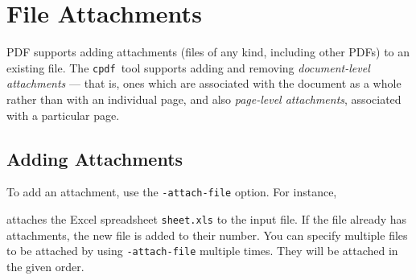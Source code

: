 \documentclass{book}
\newcommand{\cpdf}{\texttt{cpdf}}
\begin{document}
\noindent{}


\pagestyle{empty}\thispagestyle{fancy}



\chapter{File Attachments}\pagestyle{fancy}

\noindent{}


  PDF supports adding attachments (files of any kind, including other PDFs) to
an existing file. The \cpdf\ tool supports adding and removing \textit{document-level
attachments} --- that is, ones which are associated with the document as a
whole rather than with an individual page, and also \textit{page-level attachments}, associated with a particular page.
  \section{Adding Attachments}
  To add an attachment, use the \texttt{-attach-file} option. For instance,

\noindent{}

  \noindent attaches the Excel spreadsheet \texttt{sheet.xls} to the input file. If the file already has attachments, the new file is added to their number. You can specify multiple files to be attached by using \verb!-attach-file! multiple times. They will be attached in the given order.
  
\end{document}
